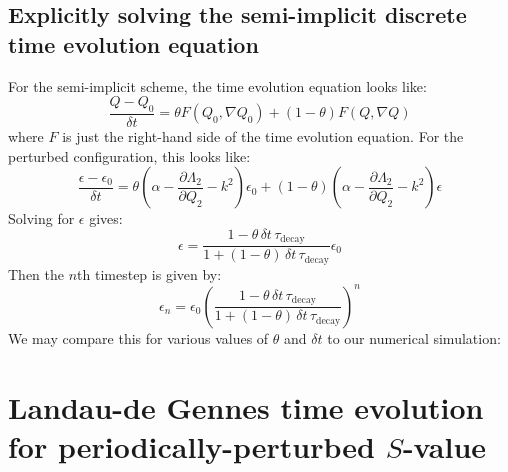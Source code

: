 \documentclass[reqno]{article}
\begin{document}
\subsection{Explicitly solving the semi-implicit discrete time evolution equation}
For the semi-implicit scheme, the time evolution equation looks like:
\begin{equation}
    \frac{Q - Q_0}{\delta t}
    =
    \theta F(Q_0, \nabla Q_0)
    + (1 - \theta) F(Q, \nabla Q)
\end{equation}
where $F$ is just the right-hand side of the time evolution equation.
For the perturbed configuration, this looks like:
\begin{equation}
    \frac{\epsilon - \epsilon_0}{\delta t}
    =
    \theta \left(\alpha - \frac{\partial \Lambda_2}{\partial Q_2} - k^2\right) \epsilon_0
    + (1 - \theta) \left(\alpha - \frac{\partial \Lambda_2}{\partial Q_2} - k^2\right) \epsilon
\end{equation}
Solving for $\epsilon$ gives:
\begin{equation}
    \epsilon
    =
    \frac{1 - \theta \, \delta t \, \tau_\text{decay}}{1 + (1 - \theta) \, \delta t \, \tau_\text{decay}} \epsilon_0
\end{equation}
Then the $n$th timestep is given by:
\begin{equation}
    \epsilon_n
    =
    \epsilon_0 \left(\frac{1 - \theta \, \delta t \, \tau_\text{decay}}{1 + (1 - \theta) \, \delta t \, \tau_\text{decay}}\right)^n 
\end{equation}
We may compare this for various values of $\theta$ and $\delta t$ to our numerical simulation:

\section{Landau-de Gennes time evolution for periodically-perturbed $S$-value}
\end{document}
